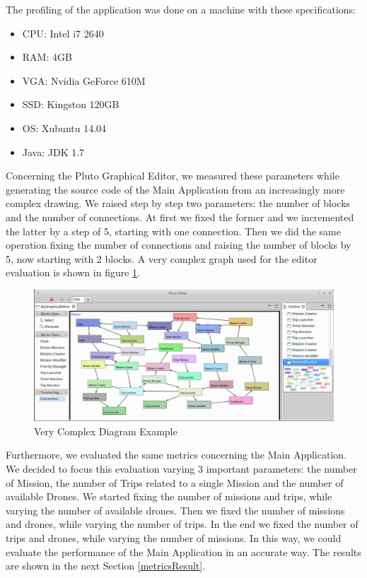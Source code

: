 The profiling of the application was done on a machine with these specifications:

\begin{itemize}
\item CPU: Intel i7 2640
\item RAM: 4GB
\item VGA: Nvidia GeForce 610M
\item SSD: Kingston 120GB
\item OS: Xubuntu 14.04
\item Java: JDK 1.7
\end{itemize}

Concerning the Pluto Graphical Editor, we measured these parameters while generating the source code of the Main Application from an increasingly more complex drawing. 
We raised step by step two parameters: the number of blocks and the number of connections.
At first we fixed the former and we incremented the latter by a step of 5, starting with one connection. Then we did the same operation fixing the number of connections and raising the number of blocks by 5, now starting with 2 blocks.
A very complex graph used for the editor evaluation is shown in figure \ref{fig:stressDiagram}.

\begin{figure}[H]
  \centering
  \includegraphics[width=\linewidth]{pictures/stressDiagram.png}
  \caption{Very Complex Diagram Example}
  \label{fig:stressDiagram}
\end{figure}

Furthermore, we evaluated the same metrics concerning the Main Application.
We decided to focus this evaluation varying 3 important parameters: the number of Mission, the number of Trips related to a single Mission and the number of available Drones. 
We started fixing the number of missions and trips, while varying the number of available drones. 
Then we fixed the number of missions and drones, while varying the number of trips. 
In the end we fixed the number of trips and drones, while varying the number of missions.
In this way, we could evaluate the performance of the Main Application in an accurate way.
The results are shown in the next Section \ref{metricsResult}.

